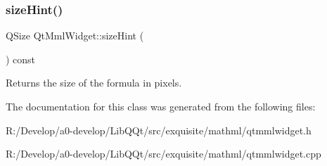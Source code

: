 \subsubsection{\texorpdfstring{size\+Hint()}{sizeHint()}}
{\footnotesize\ttfamily Q\+Size Qt\+Mml\+Widget\+::size\+Hint (\begin{DoxyParamCaption}{ }\end{DoxyParamCaption}) const\hspace{0.3cm}{\ttfamily [virtual]}}

Returns the size of the formula in pixels. 

The documentation for this class was generated from the following files\+:\begin{DoxyCompactItemize}
\item 
R\+:/\+Develop/a0-\/develop/\+Lib\+Q\+Qt/src/exquisite/mathml/qtmmlwidget.\+h\item 
R\+:/\+Develop/a0-\/develop/\+Lib\+Q\+Qt/src/exquisite/mathml/qtmmlwidget.\+cpp\end{DoxyCompactItemize}

